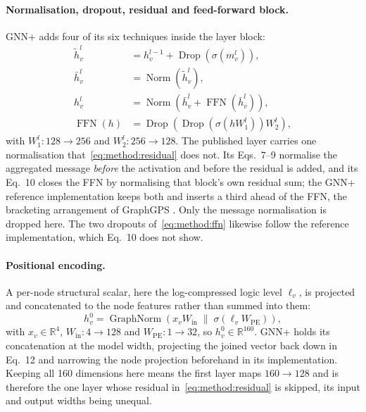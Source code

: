 \paragraph{Normalisation, dropout, residual and feed-forward block.}
GNN+ adds four of its six techniques inside the layer block:
\begin{align}
    \tilde{h}_v^{l} &= h_v^{l-1} + \operatorname{Drop}\!\left( \sigma(m_v^{l}) \right),
    \label{eq:method:residual} \\
    \bar{h}_v^{l} &= \operatorname{Norm}\!\left( \tilde{h}_v^{l} \right),
    \label{eq:method:norm1} \\
    h_v^{l} &= \operatorname{Norm}\!\left( \bar{h}_v^{l}
        + \operatorname{FFN}(\bar{h}_v^{l}) \right),
    \label{eq:method:layer} \\
    \operatorname{FFN}(h) &= \operatorname{Drop}\!\left(
        \operatorname{Drop}\!\left( \sigma(h W_1^{l}) \right) W_2^{l} \right),
    \label{eq:method:ffn}
\end{align}
with $W_1^{l} \colon 128 \rightarrow 256$ and $W_2^{l} \colon 256 \rightarrow 128$. The
published layer carries one normalisation that~\eqref{eq:method:residual} does not. Its
Eqs.~7--9 normalise the aggregated message \emph{before} the activation and before the
residual is added, and its Eq.~10 closes the FFN by normalising that block's own residual
sum; the GNN+ reference implementation keeps both and inserts a third ahead of the FFN,
the bracketing arrangement of GraphGPS \citep{rampasek2022graphgps}. Only the message
normalisation is dropped here. The two dropouts of~\eqref{eq:method:ffn} likewise follow
the reference implementation, which Eq.~10 does not show.

\paragraph{Positional encoding.}
A per-node structural scalar, here the log-compressed logic level $\ell_v$, is
projected and concatenated to the node features rather than summed into them:
\begin{equation}
    h_v^{0} = \operatorname{GraphNorm}\!\left(
        x_v W_{\text{in}} \;\big\|\; \sigma(\ell_v W_{\text{PE}}) \right),
    \label{eq:method:input}
\end{equation}
with $x_v \in \mathbb{R}^{4}$, $W_{\text{in}} \colon 4 \rightarrow 128$ and
$W_{\text{PE}} \colon 1 \rightarrow 32$, so $h_v^{0} \in \mathbb{R}^{160}$. GNN+ holds its
concatenation at the model width, projecting the joined vector back down in Eq.~12 and
narrowing the node projection beforehand in its implementation. Keeping all 160
dimensions here means the
first layer maps $160 \rightarrow 128$ and is therefore the one layer whose residual
in~\eqref{eq:method:residual} is skipped, its input and output widths being unequal.

